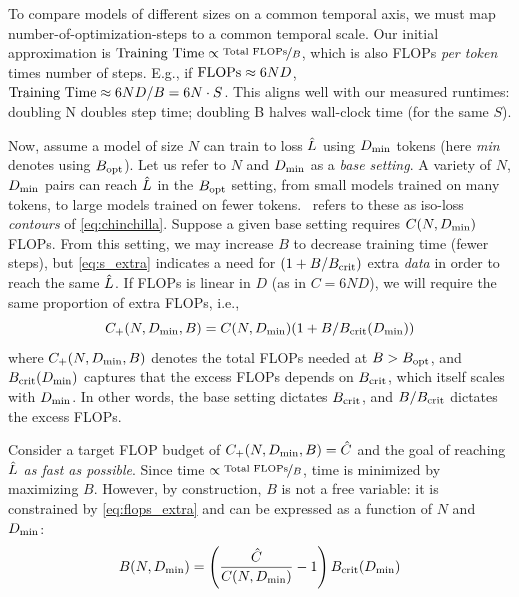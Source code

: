 %
To compare models of different sizes on a common temporal
axis, we must map number-of-optimization-steps to a common temporal scale.
%
Our initial approximation is
\mbox{$\text{Training Time} \propto \nicefrac{\text{Total $\text{FLOPs}$}}{B}$},
which is also FLOPs \emph{per token} times number of steps.  E.g., if
\mbox{$\text{FLOPs} \approx 6ND$}, \mbox{$\text{Training Time} \approx {6ND}/{B} = 6N \cdot S$}.  This
aligns well with our measured runtimes: doubling N doubles step time;
doubling B halves wall-clock time (for the same $S$).
%

Now, assume a model of size $N$ can train to loss $\hat{L}$ using
$D_{\text{min}}$ tokens (here \emph{min} denotes using $B_{\text{opt}}$).
%
Let us refer to $N$ and $D_{\text{min}}$ as a \emph{base setting}.
%
A variety of $N$, $D_{\text{min}}$ pairs can reach $\hat{L}$ in the $B_{\text{opt}}$
setting, from small models trained on many tokens, to large models
trained on fewer tokens.  \citet{hoffmann2022empirical}~refers to
these as iso-loss \emph{contours} of \cref{eq:chinchilla}.
%
Suppose a given base setting requires $C(N, D_{\text{min}})$ FLOPs.
%
From this setting, we may increase $B$ to decrease training time
(fewer steps), but \cref{eq:s_extra} indicates a need for $(1 +
{B}/{B_{\text{crit}}})$ extra \emph{data} in order to reach the same $\hat{L}$.  If
FLOPs is linear in $D$ (as in $C = 6ND$), we will require the same
proportion of extra FLOPs, i.e.,
\begin{equation}\label{eq:flops_extra}
  C_{\text{+}}(N,D_{\text{min}},B) = C(N, D_{\text{min}})(1 + {B}/{B_{\text{crit}}(D_{\text{min}})})
\end{equation}
where $C_{\text{+}}(N,D_{\text{min}},B)$ denotes the total FLOPs needed at $B > B_{\text{opt}}$, and
$B_{\text{crit}}(D_{\text{min}})$ captures that the excess FLOPs depends on $B_{\text{crit}}$,
which itself scales with $D_{\text{min}}$.  In other words, the base setting
dictates $B_{\text{crit}}$, and $B/B_{\text{crit}}$ dictates the excess FLOPs.

Consider a target FLOP budget of $C_{\text{+}}(N,D_{\text{min}},B) = \hat{C}$ and the goal of
reaching $\hat{L}$ \emph{as fast as possible}.
%
Since time $\propto \nicefrac{\text{Total $\text{FLOPs}$}}{B}$, time is minimized by
maximizing $B$.  However, by construction, $B$ is not a free variable:
it is constrained by \cref{eq:flops_extra} and can be expressed as a
function of $N$ and $D_{\text{min}}$:
\begin{equation}\label{eq:b_equation}
  B(N,D_{\text{min}}) = \left(\frac{\hat{C}}{C(N, D_{\text{min}})} - 1 \right)B_{\text{crit}}(D_{\text{min}})
\end{equation}

